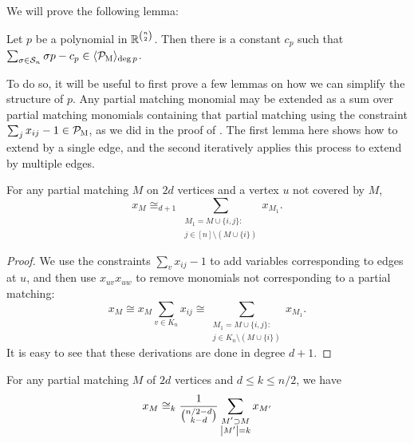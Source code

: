 We will prove the following lemma: 
\begin{lemma}
  \label{lem:constant}
  Let $p$ be a polynomial in $\mathbb R^{\binom{n}{2}}$.
	Then there is a constant $c_p$ such that $\sum_{\sigma \in \mathcal S_n} \sigma p - c_p \in \langle \mathcal P_{\textsc{M}} \rangle_{\deg p}$. 
\end{lemma}
To do so, it will be useful to first prove a few lemmas on how we can simplify the structure of $p$. 
Any partial matching monomial may be extended as a sum over partial matching monomials containing that partial matching using the constraint $\sum_j x_{ij} - 1 \in \mathcal P_{\textsc{M}}$, as we did in the proof of . The first lemma here shows how to extend by a single edge, and the second iteratively applies this process to extend by multiple edges.
\begin{lemma}
  \label{lem:matching+a}
  For any partial matching \(M\) on \(2d\) vertices
  and a vertex \(u\) not covered by \(M\),
  \begin{equation}
    \label{eq:matching+a}
    x_{M}
    \cong_{d+1}
    \sum_{\substack{M_{1} = M \cup \{i,j\}: \\
        j \in [n] \setminus (M \cup \{i\})}}
    x_{M_{1}}
    .
  \end{equation}
\end{lemma}
\begin{proof}
We use the constraints \(\sum_{v} x_{ij} - 1\)
to add variables corresponding to edges at \(u\),
and then use \(x_{uv} x_{uw}\) to remove monomials
not corresponding to a partial matching:
\begin{equation*}
  x_{M}
  \cong
  x_{M} \sum_{v \in K_n} x_{ij}
  \cong
  \sum_{\substack{M_{1} = M \cup \{i,j\}: \\
      j \in K_{n} \setminus (M \cup \{i\})}}
  x_{M_{1}}
  .
\end{equation*}
It is easy to see that these derivations are done in degree $d+1$.
\end{proof}
\begin{lemma}
  \label{lem:partial-matching}
  For any partial matching \(M\) of \(2d\) vertices
  and \(d \leq k \leq n/2\),
  we have
  \begin{equation}
    \label{eq:partial-matching}
    x_{M} \cong_k
    \frac{1}{\binom{n/2 - d}{k - d}}
    \sum_{\substack{M' \supset M \\ \left|M'\right| = k}} x_{M'}
  \end{equation}
\end{lemma}
